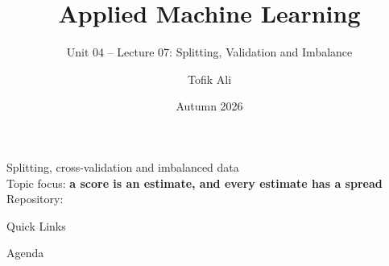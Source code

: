 \documentclass[aspectratio=169]{beamer}
\title[Applied Machine Learning]{Applied Machine Learning}
\subtitle{Unit 04 -- Lecture 07: Splitting, Validation and Imbalance}
\author{Tofik Ali}
\institute{School of Computer Science, UPES Dehradun}
\date{Autumn 2026}
\begin{document}
\UPESCoverFrame
\setcounter{framenumber}{0}

\begin{frame}
  \titlepage
  \begin{center}
    \footnotesize Splitting, cross-validation and imbalanced data\\[0.2em]
    \footnotesize Topic focus: \textbf{a score is an estimate, and every
    estimate has a spread}\\[0.2em]
    \footnotesize Repository: \texttt{\AMLRepoURL}
  \end{center}
  \slidesources{\AMLUnitIVSources}
\end{frame}

\begin{frame}{Quick Links}
  \centering
  \hyperlink{sec:split}{}\hspace{0.4em}
  \hyperlink{sec:strategy}{}\hspace{0.4em}
  \hyperlink{sec:cv}{}\hspace{0.4em}
  \hyperlink{sec:nested}{}\hspace{0.4em}
  \hyperlink{sec:imbal}{}\hspace{0.4em}
  \hyperlink{sec:summary}{}
\end{frame}

\begin{frame}{Agenda}
  \tableofcontents
\end{frame}
\end{document}
